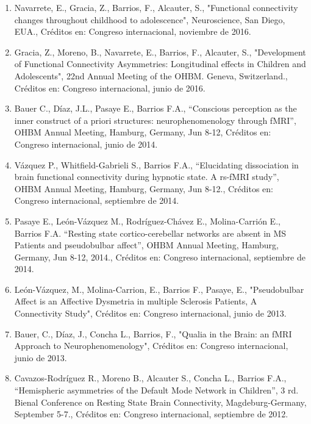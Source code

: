 \documentclass[12pt]{article}
\begin{document}
\begin{enumerate}
\item Navarrete, E., Gracia, Z., Barrios, F., Alcauter, S., "Functional connectivity changes throughout childhood to adolescence", 
Neuroscience, San Diego, EUA., Créditos en: Congreso internacional, noviembre de 2016.

\item Gracia, Z., Moreno, B., Navarrete, E., Barrios, F., Alcauter, S., "Development of Functional Connectivity Asymmetries: 
Longitudinal 
effects in Children and Adolescents", 22nd Annual Meeting of the OHBM. Geneva, Switzerland., Créditos en: Congreso internacional, junio 
de 2016.

\item Bauer C., Díaz, J.L., Pasaye E., Barrios F.A., “Conscious perception as the inner construct of a priori structures: 
neurophenomenology through fMRI”, OHBM Annual Meeting, Hamburg, Germany, Jun 8-12, Créditos en: Congreso internacional, junio de 2014.

\item Vázquez P., Whitfield-Gabrieli S., Barrios F.A., “Elucidating dissociation in brain functional connectivity during hypnotic 
state. 
A rs-fMRI study”, OHBM Annual Meeting, Hamburg, Germany, Jun 8-12., Créditos en: Congreso internacional, septiembre de 2014.

\item Pasaye E., León-Vázquez M., Rodríguez-Chávez E., Molina-Carrión E., Barrios F.A. “Resting state cortico-cerebellar networks are 
absent in MS Patients and pseudobulbar affect”, OHBM Annual Meeting, Hamburg, 
Germany, Jun 8-12, 2014., Créditos en: Congreso internacional, septiembre de 2014.

\item León-Vázquez, M., Molina-Carrion, E., Barrios F., Pasaye, E., "Pseudobulbar Affect is an Affective Dysmetria in multiple 
Sclerosis 
Patients, A Connectivity Study", Créditos en: Congreso internacional, junio de 2013.

\item Bauer, C., Díaz, J., Concha L., Barrios, F., "Qualia in the Brain: an fMRI Approach to Neurophenomenology", Créditos en: Congreso 
internacional, junio de 2013.

\item Cavazos-Rodríguez R., Moreno B., Alcauter S., Concha L., Barrios F.A., “Hemispheric asymmetries of the Default Mode Network in 
Children”, 3 rd. Bienal Conference on Resting State Brain Connectivity, Magdeburg-Germany, September 5-7., Créditos en: Congreso 
internacional, septiembre de 2012.


\end{enumerate}
\end{document}
